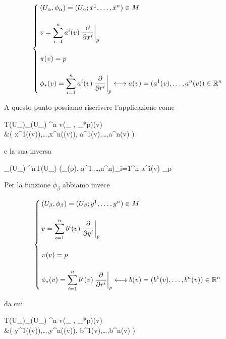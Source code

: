 \begin{equation}
	\begin{cases}
		(U_{\alpha},\phi_{\alpha}) = (U_{\alpha}; x^{1},\dots,x^{n}) \in M \\\\
		v = \displaystyle \sum_{i=1}^{n} a^{i}(v) \eval{ \pdv{x^{i}} }_{p} \\\\
		\pi(v) = p \\\\
		\phi_{*}(v) = \displaystyle \sum_{i=1}^{n} a^{i}(v) \eval{ \pdv{r^{i}} }_{p} \longleftrightarrow a(v) = (a^{1}(v),\dots,a^{n}(v)) \in \R^{n}
	\end{cases}	
\end{equation}

A questo punto possiamo riscrivere l'applicazione come

\map{\tilde{\phi}_{\alpha}}
	{T(U_{\alpha})}{\phi_{\alpha}(U_{\alpha}) \times \R^{n}}
	{v}{(\phi_{\alpha} \circ \pi, \phi_{*p})(v) \\
		&\mapsto \left( x^{1}(\pi(v)),\dots,x^{n}(\pi(v)), a^{1}(v),\dots,a^{n}(v) \right)}

e la sua inversa

	{\phi_{\alpha}(U_{\alpha}) \times \R^{n}}{T(U_{\alpha})}
	{(\phi_{\alpha}(p), a^{1},\dots,a^{n})}{\sum_{i=1}^{n} a^{i}(v) _{p}}

Per la funzione $ \tilde{\phi}_{\beta} $ abbiamo invece

\begin{equation}
	\begin{cases}
		(U_{\beta},\phi_{\beta}) = (U_{\beta}; y^{1},\dots,y^{n}) \in M \\\\
		v = \displaystyle \sum_{i=1}^{n} b^{i}(v) \eval{ \pdv{y^{i}} }_{p} \\\\
		\pi(v) = p \\\\
		\phi_{*}(v) = \displaystyle \sum_{i=1}^{n} b^{i}(v) \eval{ \pdv{r^{i}} }_{p} \longleftrightarrow b(v) = (b^{1}(v),\dots,b^{n}(v)) \in \R^{n}
	\end{cases}	
\end{equation}

da cui

\map{\tilde{\phi}_{\beta}}
	{T(U_{\beta})}{\phi_{\beta}(U_{\beta}) \times \R^{n}}
	{v}{(\phi_{\beta} \circ \pi, \phi_{*p})(v) \\
		&\mapsto \left( y^{1}(\pi(v)),\dots,y^{n}(\pi(v)), b^{1}(v),\dots,b^{n}(v) \right)}

